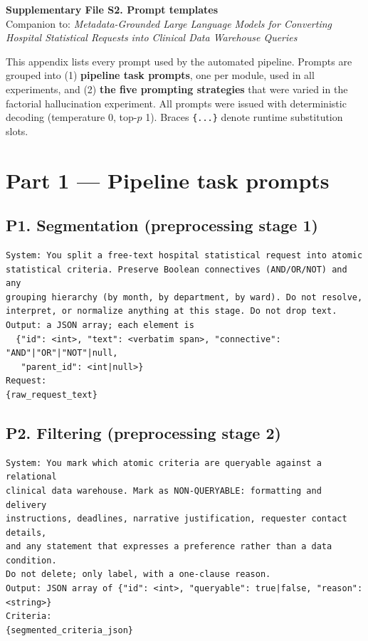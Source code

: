 \documentclass[10pt]{article}
\begin{document}
\begin{center}
{\large\bfseries Supplementary File S2. Prompt templates}\\[2pt]
{\footnotesize Companion to: \emph{Metadata-Grounded Large Language Models for Converting Hospital Statistical
Requests into Clinical Data Warehouse Queries}}
\end{center}

\vspace{6pt}
\noindent
This appendix lists every prompt used by the automated pipeline. Prompts are
grouped into (1) \textbf{pipeline task prompts}, one per module, used in all
experiments, and (2) \textbf{the five prompting strategies} that were varied in
the factorial hallucination experiment. All prompts were issued with
deterministic decoding (temperature 0, top-$p$ 1). Braces \verb|{...}| denote
runtime substitution slots.

\section{Part 1 --- Pipeline task prompts}

\subsection{P1. Segmentation (preprocessing stage 1)}
\begin{Verbatim}[fontsize=\footnotesize,frame=single,framesep=4pt]
System: You split a free-text hospital statistical request into atomic
statistical criteria. Preserve Boolean connectives (AND/OR/NOT) and any
grouping hierarchy (by month, by department, by ward). Do not resolve,
interpret, or normalize anything at this stage. Do not drop text.
Output: a JSON array; each element is
  {"id": <int>, "text": <verbatim span>, "connective": "AND"|"OR"|"NOT"|null,
   "parent_id": <int|null>}
Request:
{raw_request_text}
\end{Verbatim}

\subsection{P2. Filtering (preprocessing stage 2)}
\begin{Verbatim}[fontsize=\footnotesize,frame=single,framesep=4pt]
System: You mark which atomic criteria are queryable against a relational
clinical data warehouse. Mark as NON-QUERYABLE: formatting and delivery
instructions, deadlines, narrative justification, requester contact details,
and any statement that expresses a preference rather than a data condition.
Do not delete; only label, with a one-clause reason.
Output: JSON array of {"id": <int>, "queryable": true|false, "reason": <string>}
Criteria:
{segmented_criteria_json}
\end{Verbatim}
\end{document}
